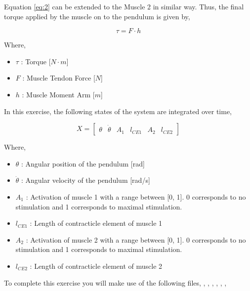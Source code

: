 \documentclass{cmc}
\begin{document}
Equation \ref{eq:2} can be extended to the Muscle 2 in similar
way. Thus, the final torque applied by the muscle on to the pendulum
is given by,

\begin{equation}
  \label{eq:3}
  \tau = F \cdot h
\end{equation}

Where,

\begin{itemize}
\item $\tau$ : Torque [$N \cdot m$]
\item $F$ : Muscle Tendon Force [$N$]
\item $h$ : Muscle Moment Arm [$m$]

\end{itemize}

In this exercise, the following states of the system are integrated
over time,

\begin{equation}
  \label{eq:1}
  X = \begin{bmatrix}
    \theta & \dot{\theta} & A_1 & l_{CE1} & A_2 & l_{CE2}
  \end{bmatrix}
\end{equation}

Where,

\begin{itemize}
\item $\theta$ : Angular position of the pendulum [rad]
\item $\dot{\theta}$ : Angular velocity of the pendulum [rad/s]
\item $A_1$ : Activation of muscle 1 with a range between [0, 1].  0
  corresponds to no stimulation and 1 corresponds to maximal
  stimulation.
\item $l_{CE1}$ : Length of contracticle element of muscle 1
\item $A_2$ : Activation of muscle 2 with a range between [0, 1].  0
  corresponds to no stimulation and 1 corresponds to maximal
  stimulation.
\item $l_{CE2}$ : Length of contracticle element of muscle 2
\end{itemize}

To complete this exercise you will make use of the following files,
, ,
, , ,
, 

\label{sec:questions}
\end{document}
